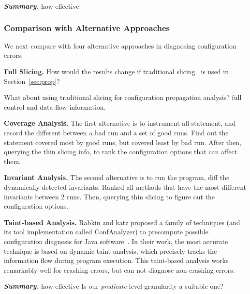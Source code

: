 \vspace{1mm}
\noindent \textbf{\textit{Summary.}} how effective


\subsubsection{Comparison with Alternative Approaches}
\label{sec:comparison}

We next compare \ourtool with four alternative approaches
in diagnosing configuration errors.

\noindent \textbf{Full Slicing.}
How would the results change if traditional slicing~\cite{Horwitz:1988} is used
in Section~\ref{sec:prop}?

What about using traditional slicing for configuration propagation analysis?
full control and data-flow information.

\vspace{1mm}
\noindent \textbf{Coverage Analysis.}
The first alternative is to instrument all statement, and record the different between a bad run and
a set of good runs. Find out the statement covered most by good runs, but covered least by bad run.
After then, querying the thin slicing info, to rank the configuration options that can affect them.

\vspace{1mm}
\noindent \textbf{Invariant Analysis.}
The second alternative is to run the program, diff the dynamically-detected invariants. Ranked all
methods that have the most different invariants between 2 runs. Then, querying thin slicing to
figure out the configuration options.


\vspace{1mm}
\noindent \textbf{Taint-based Analysis.}
Rabkin and katz proposed a family of techniques (and its tool implementation called ConfAnalyzer)
to precompute possible
configuration diagnosis for Java software~\cite{Rabkin:2011:PPC}. In their work,
the most accurate technique is based on dynamic taint analysis, which precisely
tracks the information flow during program execution. %
This taint-based analysis works remarkably well for crashing errors, but can
not diagnose non-crashing errors.


\vspace{1mm}
\noindent \textbf{\textit{Summary.}} how effective
Is our \textit{predicate}-level granularity a suitable one?

